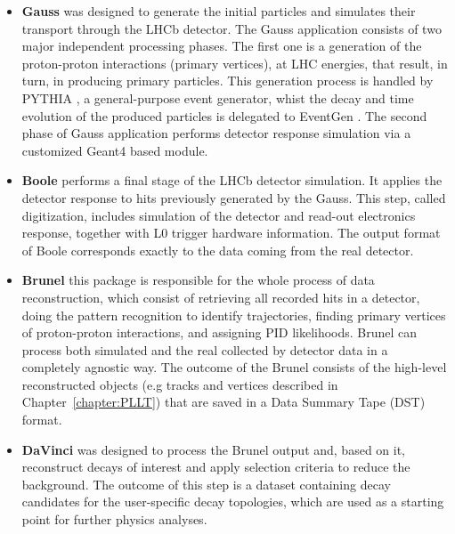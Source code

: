 \begin{itemize}
    \item \textbf{Gauss} \cite{gauss_lhcb} was designed to generate the initial particles and simulates their transport through the LHCb detector. The Gauss application consists of two major independent processing phases. The first one is a generation of the proton-proton interactions (primary vertices), at LHC energies, that result, in turn, in producing primary particles. This generation process  is handled by PYTHIA \cite{pythia}, a general-purpose event generator, whist the decay and time evolution of the produced particles is delegated to EventGen \cite{EventGen}. The second phase of Gauss application performs detector response simulation via a customized Geant4 \cite{geant4} based module. 
    \item \textbf{Boole} \cite{lhcb_software}  performs a final stage of the LHCb detector simulation. It applies the detector response to hits previously generated by the Gauss. This step, called digitization, includes simulation of the detector and read-out electronics response, together with L0 trigger hardware information. The output format of Boole corresponds exactly to the data coming from the real detector.
    \item \textbf{Brunel} \cite{lhcb_software} this package is responsible for the whole process of data reconstruction, which consist of retrieving all recorded hits in a detector, doing the pattern recognition to identify trajectories, finding primary vertices of proton-proton interactions, and assigning PID likelihoods. Brunel can process both simulated and the real collected by detector data in a completely agnostic way. The outcome of the Brunel consists of the high-level reconstructed objects (e.g tracks and vertices described in Chapter~\ref{chapter:PLLT}) that are saved in a Data Summary Tape (DST) format.   
    \item  \textbf{DaVinci} \cite{lhcb_software} was designed to process the Brunel output and, based on it, reconstruct decays of interest and apply selection criteria to reduce the background. The outcome of this step is a dataset containing decay candidates for the user-specific decay topologies, which are used as a starting point for further physics analyses.   
    
\end{itemize}


